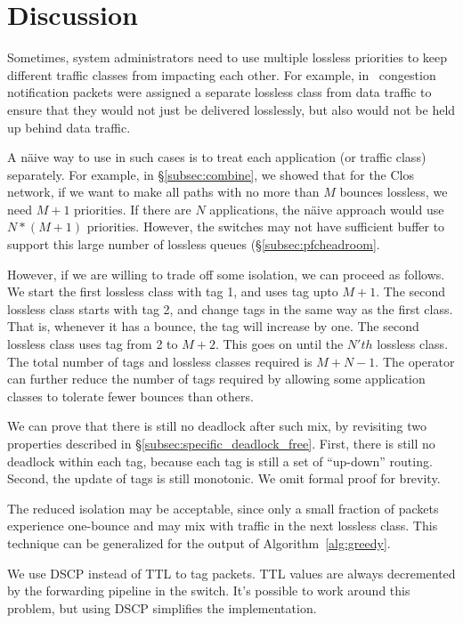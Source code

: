 \section{Discussion}

 Sometimes, system administrators need to
use multiple lossless priorities to keep different traffic classes from impacting each
other. For example, in~\cite{dcqcn} congestion notification packets were
assigned a separate lossless class from data traffic to ensure that they would
not just be delivered losslessly, but also would not be held up behind data
traffic.

A n{\"a}ive way to use \sysname{} in such cases is to treat each application (or
traffic class) separately.  For example, in \S\ref{subsec:combine}, we showed
that for the Clos network, if we want to make  all paths with no more than $M$
bounces lossless, we need $M+1$ priorities. If there are $N$ applications, the
n{\"a}ive approach would use $N*(M+1)$ priorities.  However, the switches may
not have sufficient buffer to support this large number of lossless queues
(\S\ref{subsec:pfcheadroom}.

However, if we are willing to trade off some isolation, we can proceed as
follows.  We start the first lossless class with tag 1, and uses tag upto $M+1$.
The second lossless class starts with tag 2, and change tags in the same way as
the first class.  That is, whenever it has a bounce, the tag will increase by
one. The second lossless class uses tag from 2 to $M+2$. This goes on until the
$N'th$ lossless class. The total number of tags and lossless classes required is
$M + N -1$. The operator can further reduce the number of tags required by allowing
some application classes to tolerate fewer bounces than others.

We can prove that there is still no deadlock after such mix, by revisiting two
properties described in \S\ref{subsec:specific_deadlock_free}. First, there is
still no deadlock within each tag, because each tag is still a set of
``up-down'' routing. Second, the update of tags is still monotonic. We omit
formal proof for brevity.

The reduced isolation may be acceptable, since only a small fraction of
packets experience one-bounce and may mix with traffic in the next lossless
class.  This technique can be generalized for the output of
Algorithm~\ref{alg:greedy}. 

 We use DSCP instead of TTL to tag packets. TTL
values are always decremented by the forwarding pipeline in the switch. It's
possible to work around this problem, but using DSCP simplifies the
implementation.

